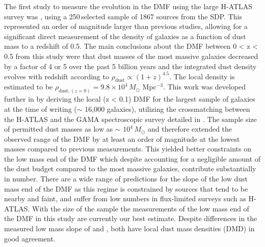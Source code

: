 The first study to measure the evolution in the DMF using the large H-ATLAS survey was \citealt{Dunne_2011}, using a 250\,\micron selected sample of 1867 sources from the SDP. This represented an order of magnitude larger than previous studies, allowing for a significant direct measurement of the density of galaxies as a function of dust mass to a redshift of 0.5. The main conclusions about the DMF between 0 < z < 0.5 from this study were that dust masses of the most massive galaxies decreased by a factor of 4 or 5 over the past 5 billion years and the integrated dust density evolves with redshift according to $\rho_{\textrm{dust}} \propto (1+z)^{4.5}$. The local density is estimated to be $\rho_{\textrm{dust}, (z=0)} = 9.8\times10^4$\,$M_\odot$ Mpc$^{-3}$. This work was developed further in \citealt{Beeston_2018} by deriving the local (z < 0.1) DMF for the largest sample of galaxies at the time of writing ($\sim$ 16,000 galaxies), utilizing the crossmatching between the H-ATLAS and the GAMA spectroscopic survey detailed in \citealt{Bourne_2016}. The sample size of \citealt{Beeston_2018} permitted dust masses as low as $\sim$ $10^4$\,$M_\odot$ and therefore extended the observed range of the DMF by at least an order of magnitude at the lowest masses compared to previous measurements. This yielded better constraints on the low mass end of the DMF which despite accounting for a negligible amount of the dust budget compared to the most massive galaxies, contribute substantially in number. There are a wide range of predictions for the slope of the low dust mass end of the DMF as this regime is constrained by sources that tend to be nearby and faint, and suffer from low numbers in flux-limited surveys such as H-ATLAS. With the size of the \citealt{Beeston_2018} sample the measurements of the low mass end of the DMF in this study are currently our best estimate. Despite differences in the measured low mass slope of \citealt{Dunne_2011} and \citealt{Beeston_2018}, both have local dust mass densities (DMD) in good agreement.

